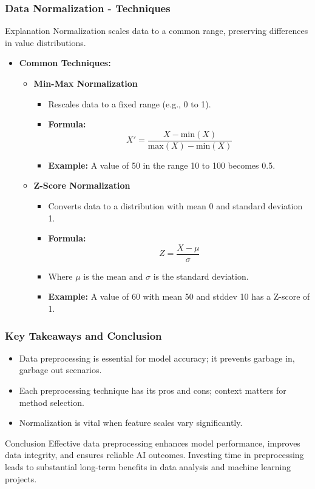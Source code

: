 \documentclass[aspectratio=169]{beamer}
\begin{document}
\begin{frame}[fragile]
    \frametitle{Data Normalization - Techniques}
    \begin{block}{Explanation}
        Normalization scales data to a common range, preserving differences in value distributions.
    \end{block}
    \begin{itemize}
        \item \textbf{Common Techniques:}
        \begin{itemize}
            \item \textbf{Min-Max Normalization}
            \begin{itemize}
                \item Rescales data to a fixed range (e.g., 0 to 1).
                \item \textbf{Formula:} 
                \[
                X' = \frac{X - \text{min}(X)}{\text{max}(X) - \text{min}(X)}
                \]
                \item \textbf{Example:} A value of 50 in the range 10 to 100 becomes 0.5.
            \end{itemize}
            \item \textbf{Z-Score Normalization}
            \begin{itemize}
                \item Converts data to a distribution with mean 0 and standard deviation 1.
                \item \textbf{Formula:} 
                \[
                Z = \frac{X - \mu}{\sigma}
                \]
                \item Where $\mu$ is the mean and $\sigma$ is the standard deviation.
                \item \textbf{Example:} A value of 60 with mean 50 and stddev 10 has a Z-score of 1.
            \end{itemize}
        \end{itemize}
    \end{itemize}
\end{frame}

\begin{frame}[fragile]
    \frametitle{Key Takeaways and Conclusion}
    \begin{itemize}
        \item Data preprocessing is essential for model accuracy; it prevents garbage in, garbage out scenarios.
        \item Each preprocessing technique has its pros and cons; context matters for method selection.
        \item Normalization is vital when feature scales vary significantly.
    \end{itemize}
    \begin{block}{Conclusion}
        Effective data preprocessing enhances model performance, improves data integrity, and ensures reliable AI outcomes. Investing time in preprocessing leads to substantial long-term benefits in data analysis and machine learning projects.
    \end{block}
\end{frame}
\end{document}
